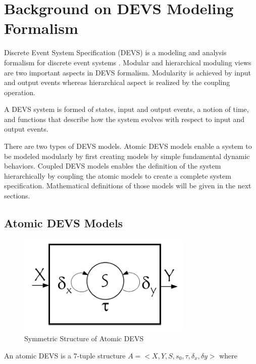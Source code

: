\chapter{Background on DEVS Modeling Formalism}
\label{Chapter:DEVS}

Discrete Event System Specification (DEVS) is a modeling and analysis formalism for discrete event systems \cite{Zeigler84}. Modular and hierarchical moduling views are two important aspects in DEVS formalism. Modularity is achieved by input and output events whereas hierarchical aspect is realized by the coupling operation.

A DEVS system is formed of states, input and output events, a notion of time, and functions that describe how the system evolves with respect to input and output events.

There are two types of DEVS models. Atomic DEVS models enable a system to be modeled modularly by first creating models by simple fundamental dynamic behaviors. Coupled DEVS models enables the definition of the system hierarchically by coupling the atomic models to create a complete system specification. Mathematical definitions of those models will be given in the next sections.

\section{Atomic DEVS Models}

\begin{figure}
 \centering
 \includegraphics[width=0.75\textwidth]{figures/atomicdevs.png}
 \caption{Symmetric Structure of Atomic DEVS}
 \label{fig:atomicdevs}
\end{figure}

An atomic DEVS is a 7-tuple structure $A = < X, Y, S, s_{0}, \tau, \delta_{x}, \delta{y} >$ \cite{Devspp} where

